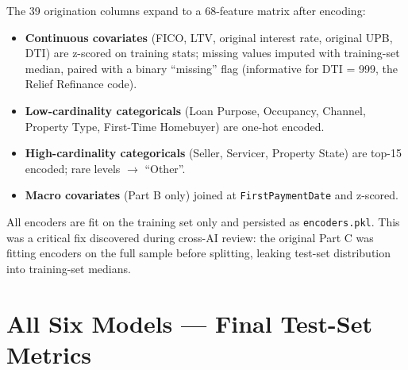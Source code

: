 \documentclass[11pt,a4paper]{article}
\begin{document}
The 39 origination columns expand to a 68-feature matrix after encoding:
\begin{itemize}[leftmargin=1.2em,itemsep=2pt,topsep=2pt]
  \item \textbf{Continuous covariates} (FICO, LTV, original interest rate, original UPB, DTI) are z-scored on training stats; missing values imputed with training-set median, paired with a binary ``missing'' flag (informative for DTI = 999, the Relief Refinance code).
  \item \textbf{Low-cardinality categoricals} (Loan Purpose, Occupancy, Channel, Property Type, First-Time Homebuyer) are one-hot encoded.
  \item \textbf{High-cardinality categoricals} (Seller, Servicer, Property State) are top-15 encoded; rare levels $\to$ ``Other''.
  \item \textbf{Macro covariates} (Part B only) joined at \texttt{FirstPaymentDate} and z-scored.
\end{itemize}

All encoders are fit on the training set only and persisted as \texttt{encoders.pkl}. This was a critical fix discovered during cross-AI review: the original Part C was fitting encoders on the full sample before splitting, leaking test-set distribution into training-set medians.

\section{All Six Models --- Final Test-Set Metrics}\label{app:metrics}
\end{document}
